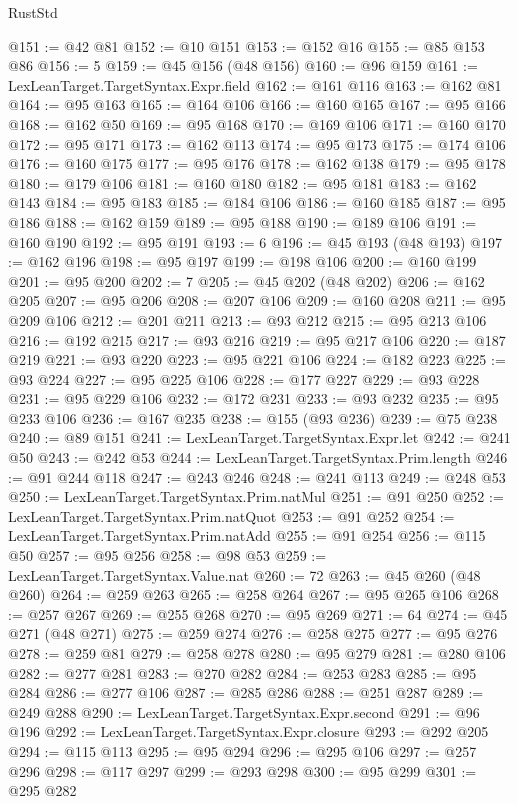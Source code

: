 \begin{lexlean}{RustStd}
\begin{coremodule}
@151 := @42 @81
@152 := @10 @151
@153 := @152 @16
@155 := @85 @153 @86
@156 := 5
@159 := @45 @156 (@48 @156)
@160 := @96 @159
@161 := LexLeanTarget.TargetSyntax.Expr.field
@162 := @161 @116
@163 := @162 @81
@164 := @95 @163
@165 := @164 @106
@166 := @160 @165
@167 := @95 @166
@168 := @162 @50
@169 := @95 @168
@170 := @169 @106
@171 := @160 @170
@172 := @95 @171
@173 := @162 @113
@174 := @95 @173
@175 := @174 @106
@176 := @160 @175
@177 := @95 @176
@178 := @162 @138
@179 := @95 @178
@180 := @179 @106
@181 := @160 @180
@182 := @95 @181
@183 := @162 @143
@184 := @95 @183
@185 := @184 @106
@186 := @160 @185
@187 := @95 @186
@188 := @162 @159
@189 := @95 @188
@190 := @189 @106
@191 := @160 @190
@192 := @95 @191
@193 := 6
@196 := @45 @193 (@48 @193)
@197 := @162 @196
@198 := @95 @197
@199 := @198 @106
@200 := @160 @199
@201 := @95 @200
@202 := 7
@205 := @45 @202 (@48 @202)
@206 := @162 @205
@207 := @95 @206
@208 := @207 @106
@209 := @160 @208
@211 := @95 @209 @106
@212 := @201 @211
@213 := @93 @212
@215 := @95 @213 @106
@216 := @192 @215
@217 := @93 @216
@219 := @95 @217 @106
@220 := @187 @219
@221 := @93 @220
@223 := @95 @221 @106
@224 := @182 @223
@225 := @93 @224
@227 := @95 @225 @106
@228 := @177 @227
@229 := @93 @228
@231 := @95 @229 @106
@232 := @172 @231
@233 := @93 @232
@235 := @95 @233 @106
@236 := @167 @235
@238 := @155 (@93 @236)
@239 := @75 @238
@240 := @89 @151
@241 := LexLeanTarget.TargetSyntax.Expr.let
@242 := @241 @50
@243 := @242 @53
@244 := LexLeanTarget.TargetSyntax.Prim.length
@246 := @91 @244 @118
@247 := @243 @246
@248 := @241 @113
@249 := @248 @53
@250 := LexLeanTarget.TargetSyntax.Prim.natMul
@251 := @91 @250
@252 := LexLeanTarget.TargetSyntax.Prim.natQuot
@253 := @91 @252
@254 := LexLeanTarget.TargetSyntax.Prim.natAdd
@255 := @91 @254
@256 := @115 @50
@257 := @95 @256
@258 := @98 @53
@259 := LexLeanTarget.TargetSyntax.Value.nat
@260 := 72
@263 := @45 @260 (@48 @260)
@264 := @259 @263
@265 := @258 @264
@267 := @95 @265 @106
@268 := @257 @267
@269 := @255 @268
@270 := @95 @269
@271 := 64
@274 := @45 @271 (@48 @271)
@275 := @259 @274
@276 := @258 @275
@277 := @95 @276
@278 := @259 @81
@279 := @258 @278
@280 := @95 @279
@281 := @280 @106
@282 := @277 @281
@283 := @270 @282
@284 := @253 @283
@285 := @95 @284
@286 := @277 @106
@287 := @285 @286
@288 := @251 @287
@289 := @249 @288
@290 := LexLeanTarget.TargetSyntax.Expr.second
@291 := @96 @196
@292 := LexLeanTarget.TargetSyntax.Expr.closure
@293 := @292 @205
@294 := @115 @113
@295 := @95 @294
@296 := @295 @106
@297 := @257 @296
@298 := @117 @297
@299 := @293 @298
@300 := @95 @299
@301 := @295 @282

\end{coremodule}
\end{lexlean}
